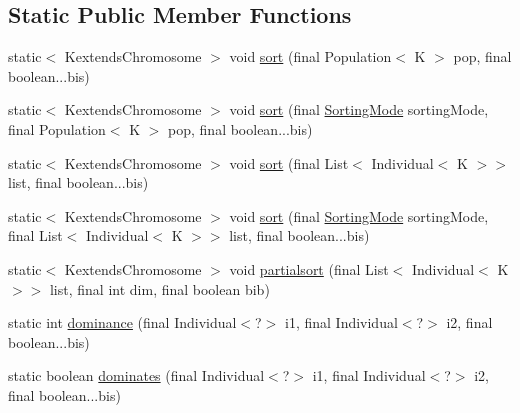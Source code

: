 \subsection*{Static Public Member Functions}
\begin{CompactItemize}
\item 
static$<$ KextendsChromosome $>$ void \hyperlink{classjenes_1_1population_1_1_fitness_3_01_c_01extends_01_chromosome_01_4_2601adaae23ba51f4f078b2e47bac2bf}{sort} (final Population$<$ K $>$ pop, final boolean...bis)
\item 
static$<$ KextendsChromosome $>$ void \hyperlink{classjenes_1_1population_1_1_fitness_3_01_c_01extends_01_chromosome_01_4_814eb910523f378522273a3fdd0cf1a6}{sort} (final \hyperlink{classjenes_1_1population_1_1_fitness_3_01_c_01extends_01_chromosome_01_4_c870345ce476556f78be491643dbb62d}{SortingMode} sortingMode, final Population$<$ K $>$ pop, final boolean...bis)
\item 
static$<$ KextendsChromosome $>$ void \hyperlink{classjenes_1_1population_1_1_fitness_3_01_c_01extends_01_chromosome_01_4_160b6471e47adc4386c1dd4122a50e25}{sort} (final List$<$ Individual$<$ K $>$$>$ list, final boolean...bis)
\item 
static$<$ KextendsChromosome $>$ void \hyperlink{classjenes_1_1population_1_1_fitness_3_01_c_01extends_01_chromosome_01_4_351dc03eea62cdfb46b5dfe8e75b34cd}{sort} (final \hyperlink{classjenes_1_1population_1_1_fitness_3_01_c_01extends_01_chromosome_01_4_c870345ce476556f78be491643dbb62d}{SortingMode} sortingMode, final List$<$ Individual$<$ K $>$$>$ list, final boolean...bis)
\item 
static$<$ KextendsChromosome $>$ void \hyperlink{classjenes_1_1population_1_1_fitness_3_01_c_01extends_01_chromosome_01_4_bb440f362a2cd5578c25d2d8dd09a33f}{partialsort} (final List$<$ Individual$<$ K $>$$>$ list, final int dim, final boolean bib)
\item 
static int \hyperlink{classjenes_1_1population_1_1_fitness_3_01_c_01extends_01_chromosome_01_4_40ee2060c7904075c6606c73f169e7b8}{dominance} (final Individual$<$?$>$ i1, final Individual$<$?$>$ i2, final boolean...bis)
\item 
static boolean \hyperlink{classjenes_1_1population_1_1_fitness_3_01_c_01extends_01_chromosome_01_4_86b15569d72a9b78c7324ee344ef3dcd}{dominates} (final Individual$<$?$>$ i1, final Individual$<$?$>$ i2, final boolean...bis)
\end{CompactItemize}
